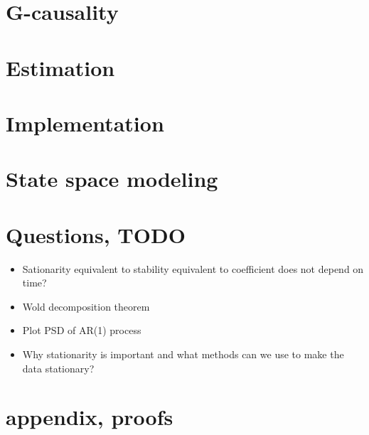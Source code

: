 \documentclass{article}
\theoremstyle{definition}
\begin{document}
\section{G-causality}
\section{Estimation}
\section{Implementation}
\section{State space modeling}
\section{Questions, TODO}
\begin{itemize}
\item Sationarity equivalent to stability equivalent to coefficient does not depend on time?
\item Wold decomposition theorem
\item Plot PSD of AR(1) process
\item Why stationarity is important and what methods can we use to make the data stationary?
\end{itemize}
\section{appendix, proofs}
\end{document}
